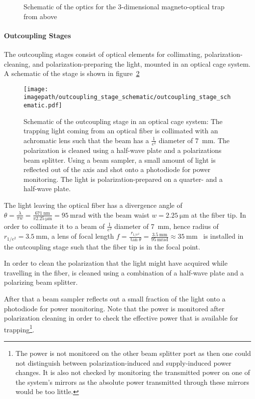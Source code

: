 \begin{figure}
    \caption{Schematic of the optics for the 3-dimensional magneto-optical trap from above}
    \label{fig:mot_optics_schematic_from_above}
\end{figure}

\paragraph{Outcoupling Stages}
The outcoupling stages consist of optical elements for collimating, polarization-cleaning, and polarization-preparing the light, mounted in an optical cage system. A schematic of the stage is shown in figure~\ref{fig:outcoupling_stage_schematic}

\begin{figure}
    \centering
    \texttt{[image: \\imagepath/outcoupling\_stage\_schematic/outcoupling\_stage\_schematic.pdf]}
    \caption{Schematic of the outcoupling stage in an optical cage system: The trapping light coming from an optical fiber is collimated with an achromatic lens such that the beam has a $\frac{1}{e^2}$ diameter of \SI{7}{\milli\meter}. The polarization is cleaned using a half-wave plate and a polarizations beam splitter. Using a beam sampler, a small amount of light is reflected out of the axis and shot onto a photodiode for power monitoring. The light is polarization-prepared on a quarter- and a half-wave plate.}
    \label{fig:outcoupling_stage_schematic}
\end{figure}

The light leaving the optical fiber has a divergence angle of $\theta = \frac{\lambda}{\pi w} = \frac{\SI{671}{\nano\meter}}{\pi\SI{2.25}{\micro\meter}} = \SI{95}{\milli\radian}$ with the beam waist $w = \SI{2.25}{\micro\meter}$ at the fiber tip. In order to collimate it to a beam of $\frac{1}{e^2}$ diameter of \SI{7}{\milli\meter}, hence radius of $r_{1/e^2} = \SI{3.5}{\milli\meter}$, a lens of focal length $f = \frac{r_{1/e^2}}{\tan \theta} = \frac{\SI{3.5}{\milli\meter}}{\SI{95}{\milli\radian}} \approx \SI{35}{\milli\meter}$~\cite{noauthor_collimated_2021} is installed in the outcoupling stage such that the fiber tip is in the focal point.

In order to clean the polarization that the light might have acquired while travelling in the fiber, is cleaned using a combination of a half-wave plate and a polarizing beam splitter.

After that a beam sampler reflects out a small fraction of the light onto a photodiode for power monitoring. Note that the power is monitored after polarization cleaning in order to check the effective power that is available for trapping\footnote{The power is not monitored on the other beam splitter port as then one could not distinguish between polarization-induced and supply-induced power changes. It is also not checked by monitoring the transmitted power on one of the system's mirrors as the absolute power transmitted through these mirrors would be too little.}.

